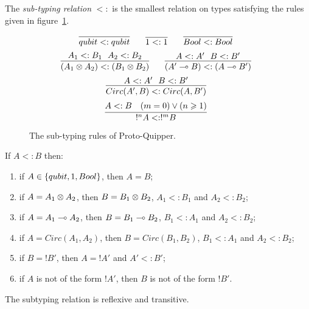 \documentclass{article}
\begin{document}
\begin{definition}
The \emph{sub-typing relation} $<:$ is the smallest relation on 
types satisfying the rules given in 
figure~\hyperref[subtyping_congruences]{\ref*{subtyping_congruences}}.
\end{definition}

\begin{figure}[!ht]
\begin{mdframed}
\[
  \infer[]{qubit <: qubit}{}
~~~~
  \infer[]{1 <: 1}{}
~~~~
  \infer[]{Bool <: Bool}{}
\]
\[
  \infer[]{ (A_1\x A_2) <:  (B_1 \x B_2)}{A_1<:B_1~~A_2<:B_2}
~~~~
  \infer[]{ (A'\loli B) <: (A\loli B')}{A<:A'~~B<:B'}
\]
\[
  \infer[]{ Circ(A', B) <:  Circ(A, B')}{A<:A'~~B<:B'}
\]
\[
  \infer[]{ !^nA <: !^mB}{
    A<:B
    &
    (m=0)\vee (n\geq 1)
  }
\]
%
\end{mdframed}
\caption{The sub-typing rules of Proto-Quipper.}
\label{subtyping_congruences}
\end{figure}

\begin{remark}
\label{subtyping_shape}
If $A<:B$ then:
\begin{enumerate}
  \item if $A\in\{qubit, 1, Bool\}$, then $A=B$;
  \item if $A=A_1\otimes A_2$, then $B=B_1\otimes B_2$, 
  $A_1<:B_1$ and $A_2<:B_2$;
  \item if $A=A_1\multimap A_2$, then $B=B_1\multimap B_2$, 
  $B_1<:A_1$ and $A_2<:B_2$;
  \item if $A=Circ(A_1, A_2)$, then $B=Circ(B_1,B_2)$, 
  $B_1<:A_1$ and $A_2<:B_2$;
  \item if $B=!B'$, then $A=!A'$ and $A'<:B'$;\label{subtype_bang}
  \item if $A$ is not of the form $!A'$, then $B$ is not 
  of the form $!B'$.
\end{enumerate}
\end{remark}

\begin{proposition}
The subtyping relation is reflexive and transitive.
\end{proposition}
\end{document}
